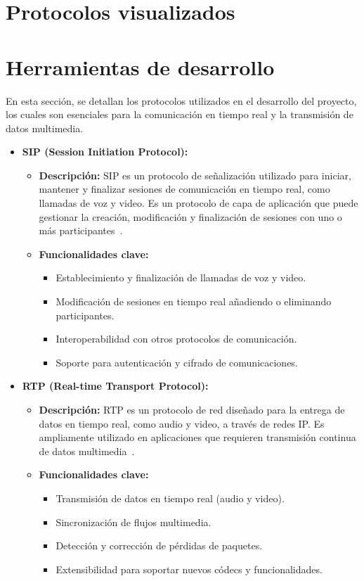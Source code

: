 \documentclass[a4paper, 12pt]{book}
\begin{document}
\section{Protocolos visualizados} 
\label{sec:protocolos}

\section{Herramientas de desarrollo} 
\label{sec:herramientas}

En esta sección, se detallan los protocolos utilizados en el desarrollo del proyecto, los cuales son esenciales para la comunicación en tiempo real y 
la transmisión de datos multimedia.

\begin{itemize}
  \item \textbf{SIP (Session Initiation Protocol):}
    \begin{itemize}
      \item \textbf{Descripción:} SIP es un protocolo de señalización utilizado para iniciar, mantener y finalizar sesiones de comunicación en tiempo real, 
      como llamadas de voz y video. Es un protocolo de capa de aplicación que puede gestionar la creación, modificación y finalización de sesiones 
      con uno o más participantes~\cite{Documentacion_SIP}.
      \item \textbf{Funcionalidades clave:}
      \begin{itemize}
        \item Establecimiento y finalización de llamadas de voz y video.
        \item Modificación de sesiones en tiempo real añadiendo o eliminando participantes.
        \item Interoperabilidad con otros protocolos de comunicación.
        \item Soporte para autenticación y cifrado de comunicaciones.
      \end{itemize}
    \end{itemize}
  
  \item \textbf{RTP (Real-time Transport Protocol):}
    \begin{itemize}
      \item \textbf{Descripción:} RTP es un protocolo de red diseñado para la entrega de datos en tiempo real, como audio y video, a través de redes IP. 
      Es ampliamente utilizado en aplicaciones que requieren transmisión continua de datos multimedia~\cite{Documentacion_RTP}.
      \item \textbf{Funcionalidades clave:}
      \begin{itemize}
        \item Transmisión de datos en tiempo real (audio y video).
        \item Sincronización de flujos multimedia.
        \item Detección y corrección de pérdidas de paquetes.
        \item Extensibilidad para soportar nuevos códecs y funcionalidades.
      \end{itemize}
    \end{itemize}
  

\end{itemize}
\end{document}
